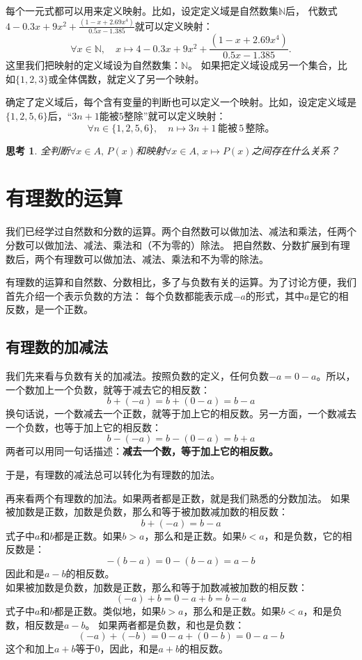 \documentclass[12pt,UTF8]{ctexbook}
\newtheorem{sk}{思考}[section]
\begin{document}
每个一元式都可以用来定义映射。比如，设定定义域是自然数集$\mathbb{N}$后，
代数式$4-0.3x+9x^2+\frac{(1-x+2.69x^4)}{0.5x-1.385}$就可以定义映射：
$$ \forall x\in\mathbb{N}, \quad x \mapsto 4-0.3x+9x^2+\frac{(1-x+2.69x^4)}{0.5x-1.385}. $$
这里我们把映射的定义域设为自然数集：$\mathbb{N}$。
如果把定义域设成另一个集合，比如$\{1,2,3\}$或全体偶数，就定义了另一个映射。

确定了定义域后，每个含有变量的判断也可以定义一个映射。比如，设定定义域是$\{1,2,5,6\}$后，“$3n+1$能被$5$整除”就可以定义映射：
$$ \forall n\in \{1,2,5,6\} , \quad n \mapsto 3n+1\,\mbox{能被}\,5\,\mbox{整除。} $$

\begin{sk}\label{sk:2-0-2}
    全判断$\forall x \in A, \, P(x)$和映射$\forall x\in A, \, x \mapsto P(x)$之间存在什么关系？
\end{sk}

\chapter{有理数的运算}
我们已经学过自然数和分数的运算。两个自然数可以做加法、减法和乘法，任两个分数可以做加法、减法、乘法和（不为零的）除法。
把自然数、分数扩展到有理数后，两个有理数可以做加法、减法、乘法和不为零的除法。

有理数的运算和自然数、分数相比，多了与负数有关的运算。为了讨论方便，我们首先介绍一个表示负数的方法：
每个负数都能表示成$-a$的形式，其中$a$是它的相反数，是一个正数。

\section{有理数的加减法}
我们先来看与负数有关的加减法。按照负数的定义，任何负数$-a = 0 - a$。所以，一个数加上一个负数，就等于减去它的相反数：
$$ b + (-a) = b + (0 - a) = b - a$$
换句话说，一个数减去一个正数，就等于加上它的相反数。另一方面，一个数减去一个负数，也等于加上它的相反数：
$$ b - (-a) = b - (0 - a) = b + a$$
两者可以用同一句话描述：\textbf{减去一个数，等于加上它的相反数。}

于是，有理数的减法总可以转化为有理数的加法。

再来看两个有理数的加法。如果两者都是正数，就是我们熟悉的分数加法。
如果被加数是正数，加数是负数，那么和等于被加数减加数的相反数：
$$ b + (-a) = b - a$$
式子中$a$和$b$都是正数。如果$b > a$，那么和是正数。如果$b < a$，和是负数，它的相反数是：
$$ -(b - a) = 0 - (b - a) = a - b$$
因此和是$a - b$的相反数。\\
如果被加数是负数，加数是正数，那么和等于加数减被加数的相反数：
$$ (-a) + b = 0 - a + b = b - a$$
式子中$a$和$b$都是正数。类似地，如果$b > a$，那么和是正数。如果$b < a$，和是负数，相反数是$a - b$。
如果两者都是负数，和也是负数：
$$ (-a) + (-b) = 0 - a + (0 - b) = 0 - a - b$$
这个和加上$a + b$等于$0$，因此，和是$a + b$的相反数。
\end{document}
